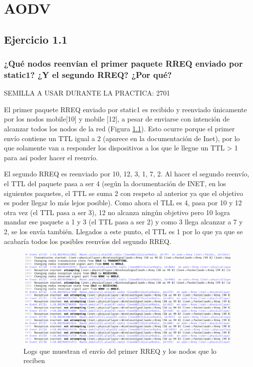 \chapter{AODV}
\label{chap:aodv}

\section{Ejercicio 1.1}

\subsection{¿Qué nodos reenvían el primer paquete RREQ enviado por static1? ¿Y el segundo RREQ? ¿Por qué?}

SEMILLA A USAR DURANTE LA PRACTICA: 2701

El primer paquete RREQ enviado por static1 es recibido y reenviado únicamente por los nodos mobile[10] y mobile [12], a pesar de enviarse con intención de alcanzar todos los nodos de la red (Figura \ref{fig:primer_rreq_reception}). Esto ocurre porque el primer envío contiene un TTL igual a 2 (aparece en la documentación de Inet), por lo que solamente van a responder los dispositivos a los que le llegue un TTL > 1 para asi poder hacer el reenvío.

El segundo RREQ es reenviado por 10, 12, 3, 1, 7, 2. Al hacer el segundo reenvío, el TTL del paquete pasa a ser 4 (según la documentación de INET, en los siguientes paquetes, el TTL se suma 2 con respeto al anterior ya que el objetivo es poder llegar lo más lejos posible). Como ahora el TLL es 4, pasa por 10 y 12 otra vez (el TTL pasa a ser 3), 12 no alcanza ningún objetivo pero 10 logra mandar ese paquete a 1 y 3 (el TTL pasa a ser 2) y como 3 llega alcanzar a 7 y 2, se los envía también. Llegados a este punto, el TTL es 1 por lo que ya que se acabaría todos los posibles reenvíos del segundo RREQ.

\begin{figure}[H]
    \centering
    \includegraphics[width=135mm, scale=0.75]{imaxes/ejercicio1_1.png}
    \caption{Logs que muestran el envío del primer RREQ y los nodos que lo reciben}
    \label{fig:primer_rreq_reception}
\end{figure}

